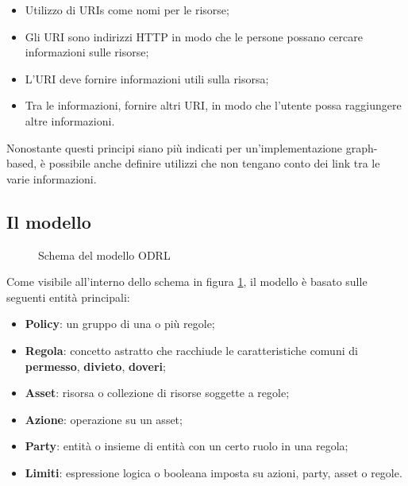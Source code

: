 \documentclass[12pt,a4paper,twoside]{book}
\begin{document}
\begin{itemize}
\item Utilizzo di URIs come nomi per le risorse;
\item Gli URI sono indirizzi HTTP in modo che le persone possano cercare informazioni sulle risorse;
\item L'URI deve fornire informazioni utili sulla risorsa;
\item Tra le informazioni, fornire altri URI, in modo che l'utente possa raggiungere altre informazioni.
\end{itemize}
Nonostante questi principi siano più indicati per un'implementazione graph-based, è possibile anche definire utilizzi che non tengano conto dei link tra le varie informazioni.
\subsection{Il modello}\label{modello}
\begin{figure}[H]
	\centering
	\def\svgwidth{\columnwidth}
	
	\caption{Schema del modello ODRL\cite{ODRLinfMod}\label{ODRLModelSchema}}
\end{figure}
Come visibile all'interno dello schema in figura \ref{ODRLModelSchema}, il modello è basato sulle seguenti entità principali:
\begin{itemize}
	\item \textbf{Policy}: un gruppo di una o più regole;
	\item \textbf{Regola}: concetto astratto che racchiude le caratteristiche comuni di \textbf{permesso}, \textbf{divieto}, \textbf{doveri};
	\item \textbf{Asset}: risorsa o collezione di risorse soggette a regole;
	\item \textbf{Azione}: operazione su un asset;
	\item \textbf{Party}: entità o insieme di entità con un certo ruolo in una regola;
	\item \textbf{Limiti}: espressione logica o booleana imposta su azioni, party, asset o regole.
\end{itemize}
\end{document}
